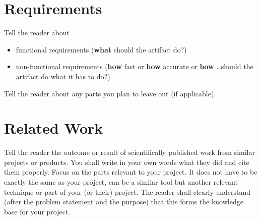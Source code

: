 \section{Requirements}
\label{sec:req}
\begin{instructions}
Tell the reader about
\begin{itemize}
    \item functional requirements (\textbf{what} should the artifact  do?)
    \item non-functional requirements (\textbf{how} fast or \textbf{how} accurate or \textbf{how} \ldots should the artifact do what it has to do?)
\end{itemize}
Tell the reader about any parts you plan to leave out (if applicable).
\end{instructions}

\section{Related Work}
\label{sec:related_work}
\begin{instructions}
Tell the reader the outcome or result of scientifically published work from similar projects or products. You shall write in your own words what they did and cite them properly. Focus on the parts relevant to your project. It does not have to be exactly the same as your project, can be a similar tool but another relevant technique or part of your (or their) project. The reader shall clearly understand (after the problem statement and the purpose) that this forms the knowledge base for your project.
\end{instructions}
